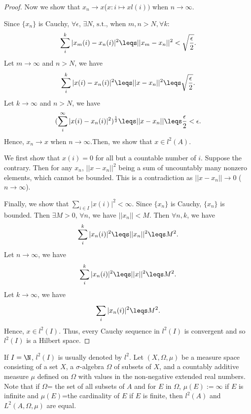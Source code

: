 \begin{proof}
    Now we show that $x_n\rightarrow x$($x:i\mapsto xl(i))$ when $n\rightarrow \infty$. 
    \par
    Since $\{x_n\}$ is Cauchy, $\forall \epsilon$, $\exists N$, $\mathrm{s.t.}$, when $m,n>N, \forall k: $
    \begin{align*}
        \sum\limits_{i}^{k}|x_m(i)-x_n(i)|^2\leqs ||x_m-x_n||^2<\sqrt{\frac{\epsilon}{2}}.
    \end{align*} 
    Let $m\rightarrow \infty$ and $n>N$, we have
    \begin{align*}
        \sum\limits_{i}^{k}|x(i)-x_n(i)|^2\leqs ||x-x_n||^2\leqs\sqrt{\frac{\epsilon}{2}}.
    \end{align*}
    Let $k\rightarrow \infty$ and $n>N$, we have
    \begin{align*}
        (\sum\limits_{i}^{\infty}|x(i)-x_n(i)|^2)^{\frac{1}{2}}\leqs ||x-x_n||\leqs\frac{\epsilon}{2}<\epsilon.
    \end{align*}
    Hence, $x_n\rightarrow x$ when $n\rightarrow \infty$.Then, we show that $x\in l^2(A)$. 
    \par
    We first show that $x(i)=0$ for all but a countable number of $i$. Suppose the contrary. 
    Then for any $x_n$, $||x-x_n||^2$ being a sum of uncountably many nonzero elements, which cannot be bounded. This is a contradiction as $||x-x_n||\rightarrow 0$ ($n\rightarrow \infty$).
    \par
    Finally, we show that $\sum\limits_{i\in I}^{}|x(i)|^2<\infty$. Since $\{x_n\}$ is Cauchy, $\{x_n\}$ is bounded. Then $\exists M>0$, $\forall n$, we have $||x_n||<M$. Then $\forall n,k$, we have
    \begin{align*}
        \sum\limits_{i}^{k}|x_n(i)|^2\leqs ||x_n||^2\leqs M^2.
    \end{align*}
    Let $n\rightarrow \infty$, we have
    \begin{align*}
        \sum\limits_{i}^{k}|x_n(i)|^2\leqs ||x||^2\leqs M^2.
    \end{align*}
    Let $k\rightarrow \infty$, we have
    \begin{align*}
        \sum\limits_{i}^{}|x_n(i)|^2\leqs M^2.
    \end{align*}
    Hence, $x\in l^2(I)$.
    Thus, every Cauchy sequence in $l^2(I)$ is convergent and so $l^2(I)$ is a Hilbert space.
\end{proof}

If $I=\N$, $l^2(I)$ is usually denoted by $l^2$. Let $(X,\Omega, \mu)$ be a measure space consisting of a set $X$, a 
$\sigma$-algebra $\Omega$ of subsets of $X$, and a countably additive measure $\mu$ defined 
on $\Omega$ with values in the non-negative extended real numbers.
Note that if $\Omega$= the set of all subsets of $A$ and for $E$ in $\Omega$, $\mu(E):=\infty$ if $E$ is infinite and $\mu(E)$=the cardinality of $E$ if $E$ is finite, 
then $l^2(A)$ and $L^2(A,\Omega,\mu)$ are equal.



